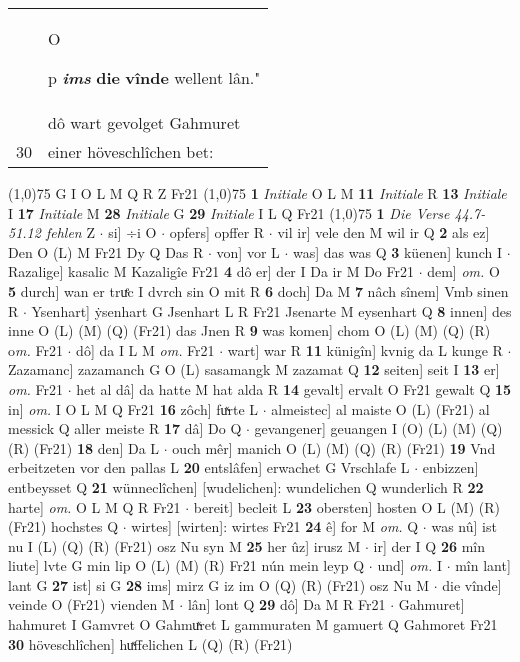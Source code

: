 \documentclass[8pt,a4paper,notitlepage]{article}
\begin{document}
\begin{table}[ht]
\begin{minipage}[t]{0.5\linewidth}
\begin{tabular}{rl}
 & \begin{large}O\end{large}p \textit{\textbf{ims}} \textbf{die} \textbf{vînde} wellent lân."\\ 
 & dô wart gevolget Gahmuret\\ 
30 & einer höveschlîchen bet:\\ 
\end{tabular}
\scriptsize
\line(1,0){75} \newline
G I O L M Q R Z Fr21 \newline
\line(1,0){75} \newline
\textbf{1} \textit{Initiale} O L M  \textbf{11} \textit{Initiale} R  \textbf{13} \textit{Initiale} I  \textbf{17} \textit{Initiale} M  \textbf{28} \textit{Initiale} G  \textbf{29} \textit{Initiale} I L Q Fr21  \newline
\line(1,0){75} \newline
\textbf{1} \textit{Die Verse 44.7-51.12 fehlen} Z   $\cdot$ si] ÷i O  $\cdot$ opfers] opffer R  $\cdot$ vil ir] vele den M wil ir Q \textbf{2} als ez] Den O (L) M Fr21 Dy Q Das R  $\cdot$ von] vor L  $\cdot$ was] das was Q \textbf{3} küenen] kunch I  $\cdot$ Razalige] kasalic M Kazaligîe Fr21 \textbf{4} dô er] der I Da ir M Do Fr21  $\cdot$ dem] \textit{om.} O \textbf{5} durch] wan er truͤc I dvrch sin O mit R \textbf{6} doch] Da M \textbf{7} nâch sînem] Vmb sinen R  $\cdot$ Ysenhart] ẏsenhart G Jsenhart L R Fr21 Jsenarte M eysenhart Q \textbf{8} innen] des inne O (L) (M) (Q) (Fr21) das Jnen R \textbf{9} was komen] chom O (L) (M) (Q) (R) o\textit{m. } Fr21  $\cdot$ dô] da I L M \textit{om.} Fr21  $\cdot$ wart] war R \textbf{11} künigîn] kvnig da L kunge R  $\cdot$ Zazamanc] zazamanch G O (L) sasamangk M zazamat Q \textbf{12} seiten] seit I \textbf{13} er] \textit{om.} Fr21  $\cdot$ het al dâ] da hatte M hat alda R \textbf{14} gevalt] ervalt O Fr21 gewalt Q \textbf{15} in] \textit{om.} I O L M Q Fr21 \textbf{16} zôch] fuͯrte L  $\cdot$ almeistec] al maiste O (L) (Fr21) al messick Q aller meiste R \textbf{17} dâ] Do Q  $\cdot$ gevangener] geuangen I (O) (L) (M) (Q) (R) (Fr21) \textbf{18} den] Da L  $\cdot$ ouch mêr] manich O (L) (M) (Q) (R) (Fr21) \textbf{19} Vnd erbeitzeten vor den pallas L \textbf{20} entslâfen] erwachet G Vrschlafe L  $\cdot$ enbizzen] entbeysset Q \textbf{21} wünneclîchen] [wudelichen]: wundelichen Q wunderlich R \textbf{22} harte] \textit{om.} O L M Q R Fr21  $\cdot$ bereit] becleit L \textbf{23} obersten] hosten O L (M) (R) (Fr21) hochstes Q  $\cdot$ wirtes] [wirten]: wirtes Fr21 \textbf{24} ê] for M \textit{om.} Q  $\cdot$ was nû] ist nu I (L) (Q) (R) (Fr21) osz Nu syn M \textbf{25} her ûz] irusz M  $\cdot$ ir] der I Q \textbf{26} mîn liute] lvte G min lip O (L) (M) (R) Fr21 nún mein leyp Q  $\cdot$ und] \textit{om.} I  $\cdot$ mîn lant] lant G \textbf{27} ist] si G \textbf{28} ims] mirz G iz im O (Q) (R) (Fr21) osz Nu M  $\cdot$ die vînde] veinde O (Fr21) vienden M  $\cdot$ lân] lont Q \textbf{29} dô] Da M R Fr21  $\cdot$ Gahmuret] hahmuret I Gamvret O Gahmuͯret L gammuraten M gamuert Q Gahmoret Fr21 \textbf{30} höveschlîchen] huͯffelichen L (Q) (R) (Fr21) \newline

\end{minipage}
\end{table}
\end{document}

